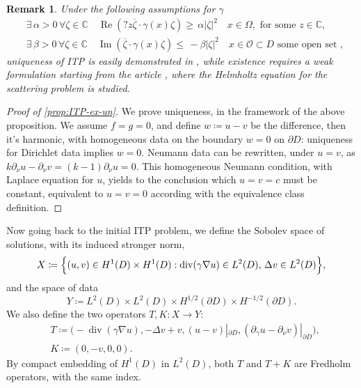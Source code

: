 \documentclass[10pt, a4paper, twoside, openright]{book}
\theoremstyle{definition}
\theoremstyle{plain}
\theoremstyle{plain}
\theoremstyle{plain}
\theoremstyle{plain}
\newtheorem{remark}[subsection]{Remark}
\theoremstyle{plain}
\theoremstyle{plain}
\theoremstyle{plain}
\theoremstyle{plain}
\DeclareMathOperator{\divergence}{div}
\DeclareMathOperator{\real}{Re}
\DeclareMathOperator{\imag}{Im}
\begin{document}
\begin{remark}
Under the following assumptions for $\gamma$
\begin{align}
 &\exists\, \alpha>0\,\forall \zeta \in \mathbb{C}\quad \real(?z\overline{\zeta}\cdot\gamma(x)\zeta)     \geq\,  \alpha|\zeta|^2 \quad x\in \Omega, \text{ for some } z \in \mathbb{C},\\
 &\exists\, \beta>0\,\forall \zeta \in \mathbb{C}\quad \imag(\overline{\zeta}\cdot\gamma(x)\zeta)        \leq\,  -\beta|\zeta|^2 \quad x\in \mathcal{O} \subset D \text{ some open set },
\end{align}
uniqueness  of ITP is easily demonstrated in \cite{somersalo:preprint}, while existence requires a weak formulation starting from the article \cite{cakoni-colton-haddar:lsm}, where the Helmholtz equation for the scattering problem is studied.
\end{remark}
\begin{proof}[Proof of \ref{prop:ITP-ex-un}]
 We prove uniqueness, in the framework of the above proposition. 
 We assume $f=g=0$, and define $w\coloneqq u-v$ be the difference, then it's harmonic, 
 with homogeneous data on the boundary $w=0$ on $\partial D$: uniqueness for Dirichlet data implies $w=0$. Neumann data can be rewritten, under $u=v$, as $k\partial_\nu u - \partial_\nu v = (k-1)\partial_\nu u = 0$.
 This homogeneous Neumann condition, with Laplace equation for $u$, yields to the conclusion which $u=v=c$ must be constant, equivalent to $u=v=0$ according with the equivalence class definition.
\end{proof}
Now going back to the initial ITP problem, we define the Sobolev space of solutions, with its induced stronger norm,
\begin{equation}
 X\coloneqq\Bigl\{(u,v)\in H^1(D)\times H^1(D):\divergence(\gamma\nabla u)\in L^2(D),\,\Delta v\in L^2(D) \Bigr\},
\end{equation}
and the space of data
\begin{equation}
 Y\coloneqq L^2(D) \times L^2(D) \times H^{1/2}(\partial D) \times H^{-1/2}(\partial D).
\end{equation}
We also define the two operators $T,K:X\to Y$:
\begin{align}
& T \coloneqq \bigl(-\divergence(\gamma\nabla u), -\Delta v + v, (u - v)|_{\partial D}, (\partial_\gamma u -\partial_\nu v)|_{\partial D}\bigr),\\
& K \coloneqq (0, -v, 0 , 0).
\end{align}
By compact embedding of $H^1(D)$ in $L^2(D)$, both $T$ and $T+K$ are Fredholm operators, with the same index. 
\end{document}
